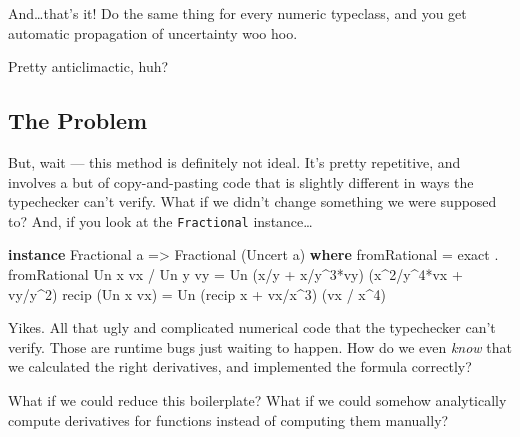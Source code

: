 \documentclass[]{article}
\newenvironment{Shaded}{}{}
\newcommand{\KeywordTok}[1]{\textcolor[rgb]{0.00,0.44,0.13}{\textbf{{#1}}}}
\newcommand{\DataTypeTok}[1]{\textcolor[rgb]{0.56,0.13,0.00}{{#1}}}
\newcommand{\DecValTok}[1]{\textcolor[rgb]{0.25,0.63,0.44}{{#1}}}
\newcommand{\OtherTok}[1]{\textcolor[rgb]{0.00,0.44,0.13}{{#1}}}
\newcommand{\FunctionTok}[1]{\textcolor[rgb]{0.02,0.16,0.49}{{#1}}}
\newcommand{\NormalTok}[1]{{#1}}
\begin{document}
And\ldots{}that's it! Do the same thing for every numeric typeclass, and
you get automatic propagation of uncertainty woo hoo.

Pretty anticlimactic, huh?

\subsection{The Problem}\label{the-problem}

But, wait --- this method is definitely not ideal. It's pretty
repetitive, and involves a but of copy-and-pasting code that is slightly
different in ways the typechecker can't verify. What if we didn't change
something we were supposed to? And, if you look at the
\texttt{Fractional} instance\ldots{}

\begin{Shaded}
\begin{Highlighting}[]
\KeywordTok{instance} \DataTypeTok{Fractional} \NormalTok{a }\OtherTok{=>} \DataTypeTok{Fractional} \NormalTok{(}\DataTypeTok{Uncert} \NormalTok{a) }\KeywordTok{where}
    \NormalTok{fromRational      }\FunctionTok{=} \NormalTok{exact }\FunctionTok{.} \NormalTok{fromRational}
    \DataTypeTok{Un} \NormalTok{x vx }\FunctionTok{/} \DataTypeTok{Un} \NormalTok{y vy }\FunctionTok{=} \DataTypeTok{Un} \NormalTok{(x}\FunctionTok{/}\NormalTok{y }\FunctionTok{+} \NormalTok{x}\FunctionTok{/}\NormalTok{y}\FunctionTok{^}\DecValTok{3}\FunctionTok{*}\NormalTok{vy)   (x}\FunctionTok{^}\DecValTok{2}\FunctionTok{/}\NormalTok{y}\FunctionTok{^}\DecValTok{4}\FunctionTok{*}\NormalTok{vx }\FunctionTok{+} \NormalTok{vy}\FunctionTok{/}\NormalTok{y}\FunctionTok{^}\DecValTok{2}\NormalTok{)}
    \NormalTok{recip (}\DataTypeTok{Un} \NormalTok{x vx)   }\FunctionTok{=} \DataTypeTok{Un} \NormalTok{(recip x }\FunctionTok{+} \NormalTok{vx}\FunctionTok{/}\NormalTok{x}\FunctionTok{^}\DecValTok{3}\NormalTok{) (vx }\FunctionTok{/} \NormalTok{x}\FunctionTok{^}\DecValTok{4}\NormalTok{)}
\end{Highlighting}
\end{Shaded}

Yikes. All that ugly and complicated numerical code that the typechecker
can't verify. Those are runtime bugs just waiting to happen. How do we
even \emph{know} that we calculated the right derivatives, and
implemented the formula correctly?

What if we could reduce this boilerplate? What if we could somehow
analytically compute derivatives for functions instead of computing them
manually?
\end{document}
